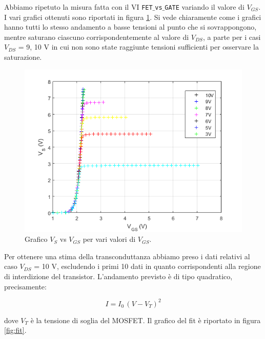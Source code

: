 \documentclass[journal, a4paper]{IEEEtran}
\begin{document}
Abbiamo ripetuto la misura fatta con il VI \texttt{FET$\_$vs$\_$GATE} variando il valore di $V_{GS}$. I vari grafici ottenuti sono riportati in figura \ref{fig:all}. Si vede chiaramente come i grafici hanno tutti lo stesso andamento a basse tensioni al punto che si sovrappongono, mentre saturano ciascuno corrispondentemente al valore di $V_{DS}$, a parte per i casi $V_{DS}$ = 9, 10 V in cui non sono state raggiunte tensioni sufficienti per osservare la saturazione.\\

\begin{figure}[htp]
\centering
\includegraphics[scale=.5]{all}
\caption{Grafico $V_S$ vs $V_{GS}$ per vari valori di $V_{GS}$.}
\label{fig:all}
\end{figure}

Per ottenere una stima della transconduttanza abbiamo preso i dati relativi al caso $V_{DS}$ = 10 V, escludendo i primi 10 dati in quanto corrispondenti alla regione di interdizione del transistor. L'andamento previsto è di tipo quadratico, precisamente:

\begin{equation}
I = I_0 \, (V-V_T)^2
\end{equation}

dove $V_T$ è la tensione di soglia del MOSFET. Il grafico del fit è riportato in figura \ref{fig:fit}.
\end{document}
